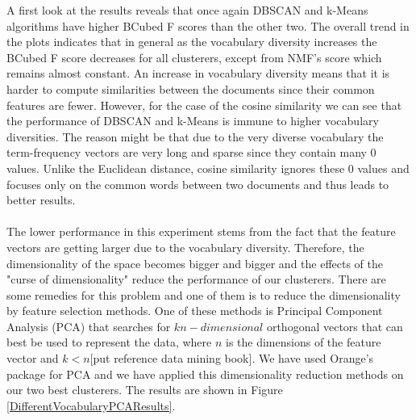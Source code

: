 A first look at the results reveals that once again DBSCAN and k-Means algorithms have higher BCubed F scores than the other two. The overall trend in the plots indicates that in general as the vocabulary diversity increases the BCubed F score decreases for all clusterers, except from NMF's score which remains almost constant. An increase in vocabulary diversity means that it is harder to compute similarities between the documents since their common features are fewer. However, for the case of the cosine similarity we can see that the performance of DBSCAN and k-Means is immune to higher vocabulary diversities. The reason might be that due to the very diverse vocabulary the term-frequency vectors are very long and sparse since they contain many 0 values. Unlike the Euclidean distance, cosine similarity ignores these 0 values and focuses only on the common words between two documents and thus leads to better results.\\\\
The lower performance in this experiment stems from the fact that the feature vectors are getting larger due to the vocabulary diversity. Therefore, the dimensionality of the space becomes bigger and bigger and the effects of the "curse of dimensionality" reduce the performance of our clusterers. There are some remedies for this problem and one of them is to reduce the dimensionality by feature selection methods. One of these methods is Principal Component Analysis (PCA) that searches for $k n-dimensional$ orthogonal vectors that can best be used to represent the data, where $n$ is the dimensions of the feature vector and $k < n$[put reference data mining book]. We have used Orange's package for PCA and we have applied this dimensionality reduction methods on our two best clusterers. The results are shown in Figure \ref{DifferentVocabularyPCAResults}.\\\\ 
